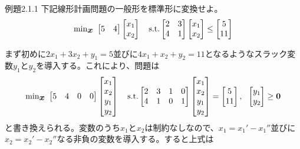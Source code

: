 \documentclass[dvipdfmx, 9pt, a4paper]{jsarticle}
\numberwithin{equation}{section}
\newcommand{\bm}[1]{{\mbox{\boldmath $#1$}}}
\begin{document}
\begin{itembox}[l]{例題2.1.1}
下記線形計画問題の一般形を標準形に変換せよ。
\begin{equation}
{\rm min}_{\bm x}~
\begin{bmatrix}
5 & 4
\end{bmatrix}
\begin{bmatrix}
x_1 \\ x_2
\end{bmatrix}
~~~{\rm s.t.}
\begin{bmatrix}
2 & 3 \\
4 & 1 
\end{bmatrix}
\begin{bmatrix}
x_1 \\ x_2
\end{bmatrix}
\leq
\begin{bmatrix}
5 \\ 11
\end{bmatrix}\notag
\end{equation}
\end{itembox}\par
まず初めに$2x_1+3x_2+y_1=5$並びに$4x_1+x_2+y_2=11$となるようなスラック変数$y_1$と$y_2$を導入する。これにより、問題は
\begin{equation}
{\rm min}_{\bm x}~
\begin{bmatrix}
5 & 4 & 0 & 0
\end{bmatrix}
\begin{bmatrix}
x_1 \\ x_2 \\ y_1 \\ y_2
\end{bmatrix}
~~~{\rm s.t.}
\begin{bmatrix}
2 & 3 & 1 & 0\\
4 & 1 & 0 & 1
\end{bmatrix}
\begin{bmatrix}
x_1 \\ x_2 \\ y_1 \\ y_2
\end{bmatrix}
=
\begin{bmatrix}
5 \\ 11
\end{bmatrix},~~
\begin{bmatrix}
y_1 \\ y_2
\end{bmatrix} \geq \bm 0\notag
\end{equation}
と書き換えられる。変数のうち$x_1$と$x_2$は制約なしなので、$x_1=x_1'-x_1''$並びに$x_2=x_2'-x_2''$なる非負の変数を導入する。すると上式は
\end{document}
